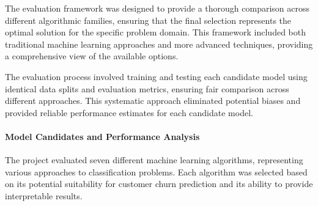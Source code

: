 \documentclass{article}
\begin{document}
The evaluation framework was designed to provide a thorough comparison across different algorithmic families, ensuring that the final selection represents the optimal solution for the specific problem domain. This framework included both traditional machine learning approaches and more advanced techniques, providing a comprehensive view of the available options.

The evaluation process involved training and testing each candidate model using identical data splits and evaluation metrics, ensuring fair comparison across different approaches. This systematic approach eliminated potential biases and provided reliable performance estimates for each candidate model.

\paragraph{Model Candidates and Performance Analysis}

The project evaluated seven different machine learning algorithms, representing various approaches to classification problems. Each algorithm was selected based on its potential suitability for customer churn prediction and its ability to provide interpretable results.
\end{document}

